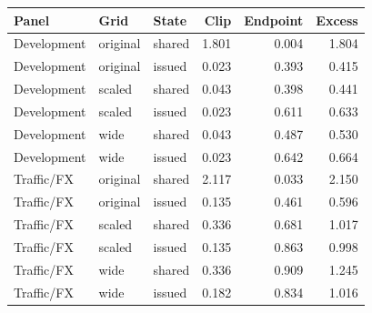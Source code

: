 \begin{tabular}{lllrrr}
\toprule
Panel & Grid & State & Clip & Endpoint & Excess \\
\midrule
Development & original & shared & 1.801 & 0.004 & 1.804 \\
Development & original & issued & 0.023 & 0.393 & 0.415 \\
Development & scaled & shared & 0.043 & 0.398 & 0.441 \\
Development & scaled & issued & 0.023 & 0.611 & 0.633 \\
Development & wide & shared & 0.043 & 0.487 & 0.530 \\
Development & wide & issued & 0.023 & 0.642 & 0.664 \\
Traffic/FX & original & shared & 2.117 & 0.033 & 2.150 \\
Traffic/FX & original & issued & 0.135 & 0.461 & 0.596 \\
Traffic/FX & scaled & shared & 0.336 & 0.681 & 1.017 \\
Traffic/FX & scaled & issued & 0.135 & 0.863 & 0.998 \\
Traffic/FX & wide & shared & 0.336 & 0.909 & 1.245 \\
Traffic/FX & wide & issued & 0.182 & 0.834 & 1.016 \\
\bottomrule
\end{tabular}
